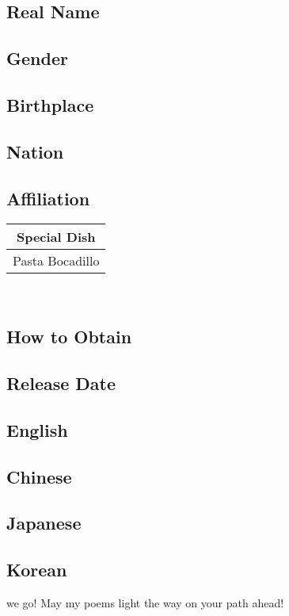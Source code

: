\documentclass[a4paper,12pt]{article}
\begin{document}
\subsection*{Real Name}\n\n\subsection*{Gender}\n\n\subsection*{Birthplace}\n\n\subsection*{Nation}\n\n\subsection*{Affiliation}\n\n\begin{tabular}{|c|} \hline
Special Dish \\
 \hline
Pasta Bocadillo \\
\end{tabular}\\ \par \vspace{0.5cm}

\subsection*{How to Obtain}\n\n\subsection*{Release Date}\n\n\subsection*{English}\n\n\subsection*{Chinese}\n\n\subsection*{Japanese}\n\n\subsection*{Korean}\n\nOff we go! May my poems light the way on your path ahead!\\ \par \vspace{0.5cm}
\end{document}
